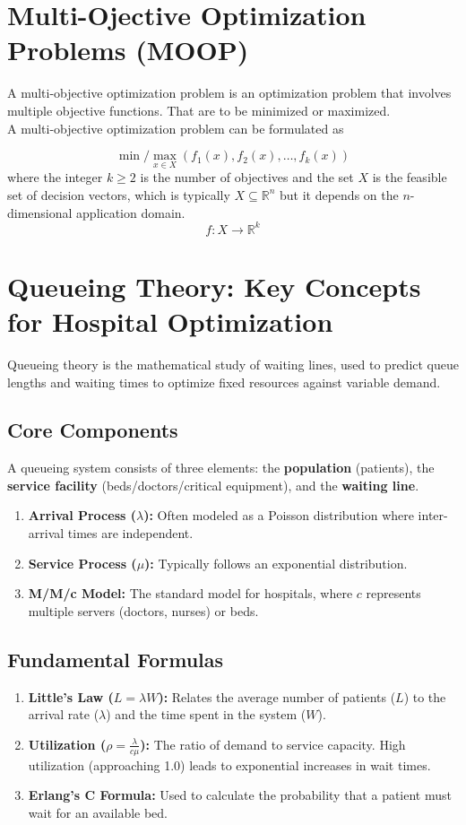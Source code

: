 \documentclass[12pt,a4paper]{article}
\begin{document}
	
	\section{Multi-Ojective Optimization Problems (MOOP)}
	A multi-objective optimization problem is an optimization problem that involves multiple objective functions. That are to be minimized or maximized.\\
	A multi-objective optimization problem can be formulated as
	
	$$ {\displaystyle \min/\max _{x\in X}(f_{1}(x),f_{2}(x),\ldots ,f_{k}(x))}$$
	where the integer  $ k\geq 2$ is the number of objectives and the set  ${\displaystyle X}$ is the feasible set of decision vectors, which is typically $ {\displaystyle X\subseteq \mathbb {R}^{n}}$ but it depends on the ${\displaystyle n}$-dimensional application domain.
	$$ f : X \rightarrow \mathbb{R}^k$$ 
	
	
	\section{Queueing Theory: Key Concepts for Hospital Optimization}
	
	Queueing theory is the mathematical study of waiting lines, used to predict queue lengths and waiting times to optimize fixed resources against variable demand.
	
	\subsection*{Core Components}
	A queueing system consists of three elements: the \textbf{population} (patients), the \textbf{service facility} (beds/doctors/critical equipment), and the \textbf{waiting line}.
	\begin{enumerate}
		\item \textbf{Arrival Process ($\lambda$):} Often modeled as a Poisson distribution where inter-arrival times are independent.
		\item \textbf{Service Process ($\mu$):} Typically follows an exponential distribution.
		\item \textbf{M/M/c Model:} The standard model for hospitals, where $c$ represents multiple servers (doctors, nurses) or beds.
	\end{enumerate}
	
	\subsection*{Fundamental Formulas}
	\begin{enumerate}
		\item \textbf{Little's Law ($L = \lambda W$):} Relates the average number of patients ($L$) to the arrival rate ($\lambda$) and the time spent in the system ($W$).
		\item \textbf{Utilization ($\rho = \frac{\lambda}{c\mu}$):} The ratio of demand to service capacity. High utilization (approaching 1.0) leads to exponential increases in wait times.
		\item \textbf{Erlang’s C Formula:} Used to calculate the probability that a patient must wait for an available bed.
	\end{enumerate}
	
\end{document}
